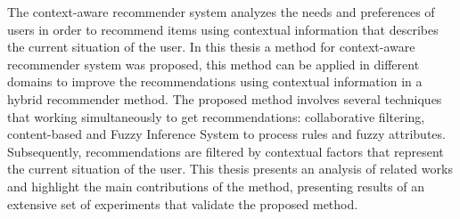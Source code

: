 The context-aware recommender system analyzes the needs and
preferences of users in order to recommend items using contextual
information that describes the current situation of the user. In this
thesis a method for context-aware recommender system was proposed,
this method can be applied in different domains to improve the
recommendations using contextual information in a hybrid recommender
method. The proposed method involves several techniques that working
simultaneously to get recommendations: collaborative filtering,
content-based and Fuzzy Inference System to process rules and fuzzy
attributes. Subsequently, recommendations are filtered by contextual
factors that represent the current situation of the user. This thesis
presents an analysis of related works and highlight the main
contributions of the method, presenting results of an extensive set of
experiments that validate the proposed method.











